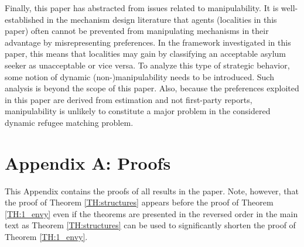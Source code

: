 \documentclass[12pt,fleqn]{article}
\begin{document}
Finally, this paper has abstracted from issues related to manipulability. It is  well-established in the mechanism design literature that agents (localities in this paper) often cannot be prevented from manipulating mechanisms in their advantage by misrepresenting preferences. In the framework investigated in this paper, this means that localities may gain by classifying an acceptable asylum seeker as unacceptable or vice versa. To analyze this type of strategic behavior, some notion of dynamic (non-)manipulability needs to be introduced. Such analysis is beyond the scope of this paper. Also, because the preferences exploited in this paper are derived from estimation and not first-party reports, manipulability is unlikely to constitute a major problem in the considered dynamic refugee matching problem.


\section*{Appendix A: Proofs}
This Appendix contains the proofs of all results in the paper. Note, however, that the proof of Theorem \ref{TH:structures} appears before the proof of Theorem \ref{TH:1_envy} even if the theorems are presented in the reversed order in the main text as Theorem \ref{TH:structures} can be used to significantly shorten the proof of Theorem \ref{TH:1_envy}.

\medskip
\end{document}

